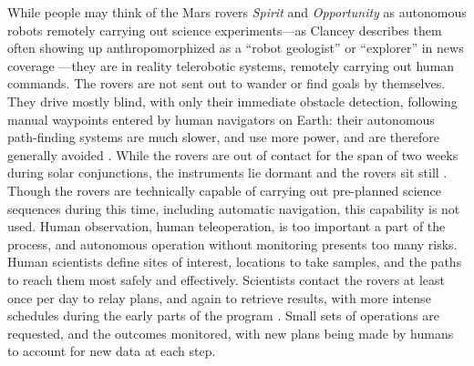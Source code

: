 While people may
think of the Mars rovers \emph{Spirit} and \emph{Opportunity} as
autonomous robots remotely carrying out science experiments---as
Clancey describes them often showing up anthropomorphized as a ``robot
geologist'' or 
``explorer'' in news coverage \cite[p. 7]{clancey}---they are
in reality telerobotic systems, remotely carrying out human commands.
The rovers are not 
sent out to wander or find goals by themselves. They drive mostly
blind, with only their immediate obstacle detection, following manual
waypoints entered by human navigators on Earth: their autonomous
path-finding systems are much slower, and use more power, and are
therefore generally avoided \cite[p. 118]{clancey}. While the rovers
are out of contact for the span of two weeks during solar
conjunctions, the instruments lie dormant and the rovers sit
still \cite[p. 25]{clancey}. Though the rovers are technically capable of
carrying out pre-planned science sequences during this time, including
automatic navigation, this capability is not used. Human observation,
human teleoperation, is too important a part of the process, and
autonomous operation without monitoring presents too many risks. Human
scientists define sites of interest, locations to take samples, and
the paths to reach them most safely and effectively. Scientists
contact the rovers at least once per day to relay plans, and again
to retrieve results, with more intense schedules during the early
parts of the program \cite[p. 58]{clancey}. Small sets of
operations are requested, and the outcomes monitored, with new plans
being made by humans to account for new data at each step.

